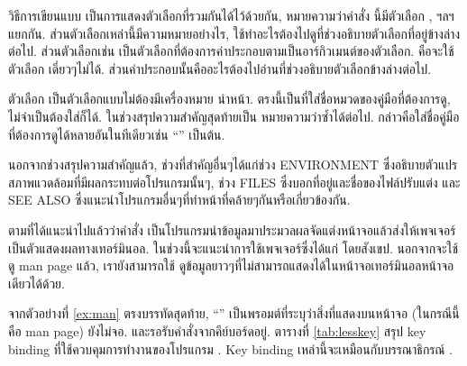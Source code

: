 \begin{thwbr}
วิธีการเขียนแบบ \cmd{[-acdfFhkKtwW]} เป็นการแสดงตัวเลือกที่รวมกันได้ไว้ด้วยกัน, หมายความว่าคำสั่ง  นี้มีตัวเลือก ,  ฯลฯ แยกกัน. ส่วนตัวเลือกเหล่านี้มีความหมายอย่างไร, ใช้ทำอะไรต้องไปดูที่ช่วงอธิบายตัวเลือกที่อยู่ข้างล่างต่อไป. ส่วนตัวเลือกเช่น \cmd{[-m system]} เป็นตัวเลือกที่ต้องการค่าประกอบตามเป็นอาร์กิวเมนต์ของตัวเลือก. คือจะใช้ตัวเลือก  เดี่ยวๆไม่ได้. ส่วนค่าประกอบนั้นคืออะไรต้องไปอ่านที่ช่วงอธิบายตัวเลือกข้างล่างต่อไป.

ตัวเลือก \cmd{[section]} เป็นตัวเลือกแบบไม่ต้องมีเครื่องหมาย \cmd{-} นำหน้า. ตรงนี้เป็นที่ใส่ชื่อหมวดของคู่มือที่ต้องการดู, ไม่จำเป็นต้องใส่ก็ได้. ในช่วงสรุปความสำคัญสุดท้ายเป็น  หมายความว่าซ้ำได้ต่อไป. กล่าวคือใส่ชื่อคู่มือที่ต้องการดูได้หลายอันในทีเดียวเช่น ``'' เป็นต้น. 



นอกจากช่วงสรุปความสำคัญแล้ว, ช่วงที่สำคัญอื่นๆได้แก่ช่วง ENVIRONMENT ซึ่งอธิบายตัวแปรสภาพแวดล้อมที่มีผลกระทบต่อโปรแกรมนั้นๆ, ช่วง FILES ซึ่งบอกที่อยู่และชื่อของไฟล์ปรับแต่ง และ SEE ALSO ซึ่งแนะนำโปรแกรมอื่นๆที่ทำหน้าที่คล้ายๆกันหรือเกี่ยวข้องกัน. 


\bigskip

ตามที่ได้แนะนำไปแล้วว่าคำสั่ง  เป็นโปรแกรมนำข้อมูลมาประมวลผลจัดแต่งหน้าจอแล้วส่งให้เพจเจอร์เป็นตัวแสดงผลทางเทอร์มินอล. ในช่วงนี้จะแนะนำการใช้เพจเจอร์ซึ่งได้แก่  โดยสังเขป. นอกจากจะใช้  ดู man page แล้ว, เรายังสามารถใช้  ดูข้อมูลยาวๆที่ไม่สามารถแสดงได้ในหน้าจอเทอร์มินอลหน้าจอเดียวได้ด้วย.

จากตัวอย่างที่ \ref{ex:man} ตรงบรรทัดสุดท้าย, ``\cmd{:\cursorprompt}'' เป็นพรอมต์ที่ระบุว่าสิ่งที่แสดงบนหน้าจอ (ในกรณีนี้คือ man page) ยังไม่จอ. และรอรับคำสั่งจากคีย์บอร์ดอยู่. ตารางที่ \ref{tab:lesskey} สรุป key binding ที่ใช้ควบคุมการทำงานของโปรแกรม . Key binding เหล่านี้จะเหมือนกับบรรณาธิกรณ์ .


\end{thwbr}
